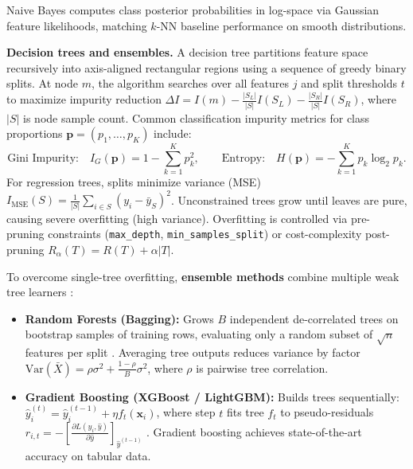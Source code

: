 \documentclass[11pt,a4paper]{article}
\begin{document}
	\begin{practicebox}

		Naive Bayes computes class posterior probabilities in log-space via Gaussian feature likelihoods, matching $k$-NN baseline performance on smooth distributions.
	\end{practicebox}

	\textbf{Decision trees and ensembles.} A decision tree partitions feature space recursively into axis-aligned rectangular regions using a sequence of greedy binary splits. At node $m$, the algorithm searches over all features $j$ and split thresholds $t$ to maximize impurity reduction $\Delta I = I(m) - \frac{|S_L|}{|S|} I(S_L) - \frac{|S_R|}{|S|} I(S_R)$, where $|S|$ is node sample count. Common classification impurity metrics for class proportions $\mathbf{p} = (p_1, \dots, p_K)$ include:
	\begin{equation}
		\text{Gini Impurity:}\quad I_G(\mathbf{p}) = 1 - \sum_{k=1}^{K} p_k^2, \qquad \text{Entropy:}\quad H(\mathbf{p}) = -\sum_{k=1}^{K} p_k \log_2 p_k .
	\end{equation}
	For regression trees, splits minimize variance (MSE) $I_{\mathrm{MSE}}(S) = \frac{1}{|S|}\sum_{i \in S}(y_i - \bar{y}_S)^2$. Unconstrained trees grow until leaves are pure, causing severe overfitting (high variance). Overfitting is controlled via pre-pruning constraints (\texttt{max\_depth}, \texttt{min\_samples\_split}) or cost-complexity post-pruning $R_\alpha(T) = R(T) + \alpha |T|$.

	To overcome single-tree overfitting, \textbf{ensemble methods} combine multiple weak tree learners \parencite{hastie2009}:
	\begin{itemize}[nosep]
		\item \textbf{Random Forests (Bagging):} Grows $B$ independent de-correlated trees on bootstrap samples of training rows, evaluating only a random subset of $\sqrt{n}$ features per split \parencite{breiman2001}. Averaging tree outputs reduces variance by factor $\mathrm{Var}(\bar{X}) = \rho \sigma^2 + \frac{1-\rho}{B}\sigma^2$, where $\rho$ is pairwise tree correlation.
		\item \textbf{Gradient Boosting (XGBoost / LightGBM):} Builds trees sequentially: $\hat{y}_i^{(t)} = \hat{y}_i^{(t-1)} + \eta f_t(\mathbf{x}_i)$, where step $t$ fits tree $f_t$ to pseudo-residuals $r_{i,t} = -\left[\frac{\partial L(y_i, \hat{y})}{\partial \hat{y}}\right]_{\hat{y}^{(t-1)}}$ \parencite{chen2016}. Gradient boosting achieves state-of-the-art accuracy on tabular data.
	\end{itemize}
\end{document}
